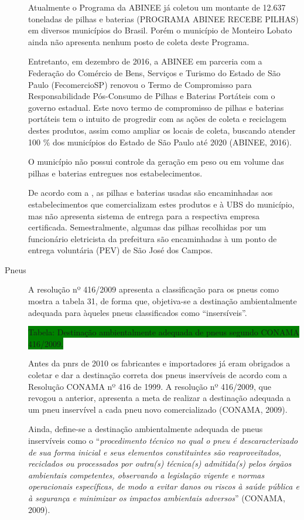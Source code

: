 \begin{description}
		Atualmente o Programa da ABINEE já coletou um montante de 12.637 toneladas de pilhas e baterias (PROGRAMA ABINEE RECEBE PILHAS) em diversos municípios do Brasil. Porém o município de Monteiro Lobato ainda não apresenta nenhum posto de coleta deste Programa.
		
		Entretanto, em dezembro de 2016, a ABINEE em parceria com a Federação do Comércio de Bens, Serviços e Turismo do Estado de São Paulo (FecomercioSP) renovou o Termo de Compromisso para Responsabilidade Pós-Consumo de Pilhas e Baterias Portáteis com o governo estadual. Este novo termo de compromisso de pilhas e baterias portáteis tem o intuito de progredir com as ações de coleta e reciclagem destes produtos, assim como ampliar os locais de coleta, buscando atender 100 \% dos municípios do Estado de São Paulo até 2020 (ABINEE, 2016).
		
			O município não possui controle da geração em peso ou em volume das pilhas e baterias entregues nos estabelecimentos.
		
			De acordo com a , as pilhas e baterias usadas são encaminhadas aos estabelecimentos que comercializam estes produtos e à UBS do município, mas não apresenta sistema de entrega para a respectiva empresa certificada. Semestralmente, algumas das pilhas recolhidas por um funcionário eletricista da prefeitura são encaminhadas à um ponto de entrega voluntária (PEV) de São José dos Campos.
		
		
		\item[Pneus] A resolução nº 416/2009 apresenta a classificação para os pneus como mostra a tabela 31, de forma que, objetiva-se a destinação ambientalmente adequada para àqueles pneus classificados como “insersíveis”.	
	
	\colorbox{green}{Tabela: Destinação ambientalmente adequada de pneus segundo CONAMA 416/2009.}
	
		Antes da \gls{pnrs} de 2010 os fabricantes e importadores já eram obrigados a coletar e dar a destinação correta dos pneus inservíveis de acordo com a Resolução CONAMA nº 416 de 1999. A resolução nº 416/2009, que revogou a anterior, apresenta a meta de realizar a destinação adequada a um pneu inservível a cada pneu novo comercializado (CONAMA, 2009).

		Ainda, define-se a destinação ambientalmente adequada de pneus inservíveis como o “\textit{procedimento técnico no qual o pneu é descaracterizado de sua forma inicial e seus elementos constituintes são reaproveitados, reciclados ou processados por outra(s) técnica(s) admitida(s) pelos órgãos ambientais competentes, observando a legislação vigente e normas operacionais específicas, de modo a evitar danos ou riscos à saúde pública e à segurança e minimizar os impactos ambientais adversos}” (CONAMA, 2009). 
	

\end{description}
